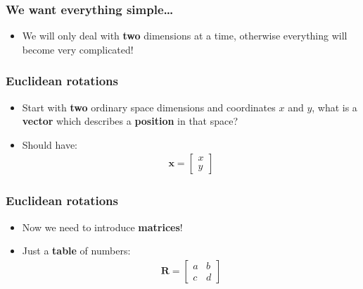 \documentclass{beamer}
\begin{document}
\begin{frame}
  \frametitle{We want everything simple\ldots}
  \begin{itemize}
    \item<1-> We will only deal with \textbf{two} dimensions at a time, otherwise everything will become very complicated!
  \end{itemize}
\end{frame}

\begin{frame}
  \frametitle{Euclidean rotations}
  \begin{itemize}
    \item<1-> Start with \textbf{two} ordinary space dimensions and coordinates $x$ and $y$, what is a \textbf{vector} which describes a \textbf{position} in that space?
    \item<2-> Should have:
      \begin{align*}
	\mathbf{x}=
	\begin{bmatrix}
	  x\\
	  y
	\end{bmatrix}
      \end{align*}
  \end{itemize}
\end{frame}

\begin{frame}
  \frametitle{Euclidean rotations}
  \begin{itemize}
    \item<1-> Now we need to introduce \textbf{matrices}!
    \item<2-> Just a \textbf{table} of numbers:
      \begin{align*}
	\mathbf{R}=
	\begin{bmatrix}
	  a & b\\
	  c & d
	\end{bmatrix}
      \end{align*}
  \end{itemize}
\end{frame}
\end{document}
